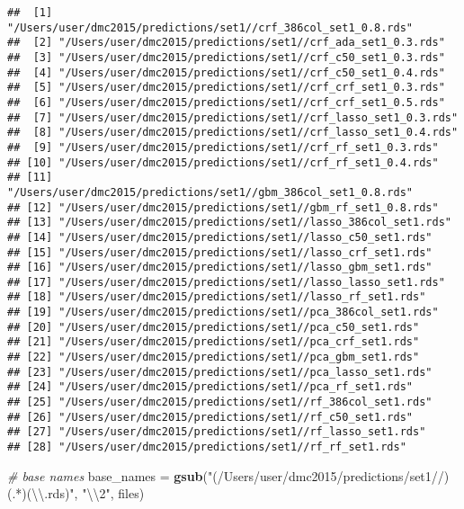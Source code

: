 \documentclass[10pt]{report}
\newenvironment{Shaded}{}{}
\newcommand{\KeywordTok}[1]{\textcolor[rgb]{0.00,0.44,0.13}{\textbf{{#1}}}}
\newcommand{\CharTok}[1]{\textcolor[rgb]{0.25,0.44,0.63}{{#1}}}
\newcommand{\StringTok}[1]{\textcolor[rgb]{0.25,0.44,0.63}{{#1}}}
\newcommand{\CommentTok}[1]{\textcolor[rgb]{0.38,0.63,0.69}{\textit{{#1}}}}
\newcommand{\NormalTok}[1]{{#1}}
\begin{document}
\begin{verbatim}
##  [1] "/Users/user/dmc2015/predictions/set1//crf_386col_set1_0.8.rds"
##  [2] "/Users/user/dmc2015/predictions/set1//crf_ada_set1_0.3.rds"   
##  [3] "/Users/user/dmc2015/predictions/set1//crf_c50_set1_0.3.rds"   
##  [4] "/Users/user/dmc2015/predictions/set1//crf_c50_set1_0.4.rds"   
##  [5] "/Users/user/dmc2015/predictions/set1//crf_crf_set1_0.3.rds"   
##  [6] "/Users/user/dmc2015/predictions/set1//crf_crf_set1_0.5.rds"   
##  [7] "/Users/user/dmc2015/predictions/set1//crf_lasso_set1_0.3.rds" 
##  [8] "/Users/user/dmc2015/predictions/set1//crf_lasso_set1_0.4.rds" 
##  [9] "/Users/user/dmc2015/predictions/set1//crf_rf_set1_0.3.rds"    
## [10] "/Users/user/dmc2015/predictions/set1//crf_rf_set1_0.4.rds"    
## [11] "/Users/user/dmc2015/predictions/set1//gbm_386col_set1_0.8.rds"
## [12] "/Users/user/dmc2015/predictions/set1//gbm_rf_set1_0.8.rds"    
## [13] "/Users/user/dmc2015/predictions/set1//lasso_386col_set1.rds"  
## [14] "/Users/user/dmc2015/predictions/set1//lasso_c50_set1.rds"     
## [15] "/Users/user/dmc2015/predictions/set1//lasso_crf_set1.rds"     
## [16] "/Users/user/dmc2015/predictions/set1//lasso_gbm_set1.rds"     
## [17] "/Users/user/dmc2015/predictions/set1//lasso_lasso_set1.rds"   
## [18] "/Users/user/dmc2015/predictions/set1//lasso_rf_set1.rds"      
## [19] "/Users/user/dmc2015/predictions/set1//pca_386col_set1.rds"    
## [20] "/Users/user/dmc2015/predictions/set1//pca_c50_set1.rds"       
## [21] "/Users/user/dmc2015/predictions/set1//pca_crf_set1.rds"       
## [22] "/Users/user/dmc2015/predictions/set1//pca_gbm_set1.rds"       
## [23] "/Users/user/dmc2015/predictions/set1//pca_lasso_set1.rds"     
## [24] "/Users/user/dmc2015/predictions/set1//pca_rf_set1.rds"        
## [25] "/Users/user/dmc2015/predictions/set1//rf_386col_set1.rds"     
## [26] "/Users/user/dmc2015/predictions/set1//rf_c50_set1.rds"        
## [27] "/Users/user/dmc2015/predictions/set1//rf_lasso_set1.rds"      
## [28] "/Users/user/dmc2015/predictions/set1//rf_rf_set1.rds"
\end{verbatim}

\begin{Shaded}
\begin{Highlighting}[]
\CommentTok{# base names}
\NormalTok{base_names =}\StringTok{ }\KeywordTok{gsub}\NormalTok{(}\StringTok{"(/Users/user/dmc2015/predictions/set1//)(.*)(}\CharTok{\textbackslash{}\textbackslash{}}\StringTok{.rds)"}\NormalTok{, }\StringTok{"}\CharTok{\textbackslash{}\textbackslash{}}\StringTok{2"}\NormalTok{, }
    \NormalTok{files)}
\end{Highlighting}
\end{Shaded}
\end{document}
